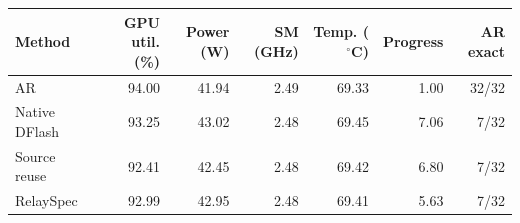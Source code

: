 \begin{tabular}{lrrrrrr}
\toprule
Method & GPU util. (\%) & Power (W) & SM (GHz) & Temp. ($^\circ$C) & Progress & AR exact \\
\midrule
AR & 94.00 & 41.94 & 2.49 & 69.33 & 1.00 & 32/32 \\
Native DFlash & 93.25 & 43.02 & 2.48 & 69.45 & 7.06 & 7/32 \\
Source reuse & 92.41 & 42.45 & 2.48 & 69.42 & 6.80 & 7/32 \\
RelaySpec & 92.99 & 42.95 & 2.48 & 69.41 & 5.63 & 7/32 \\
\bottomrule
\end{tabular}
